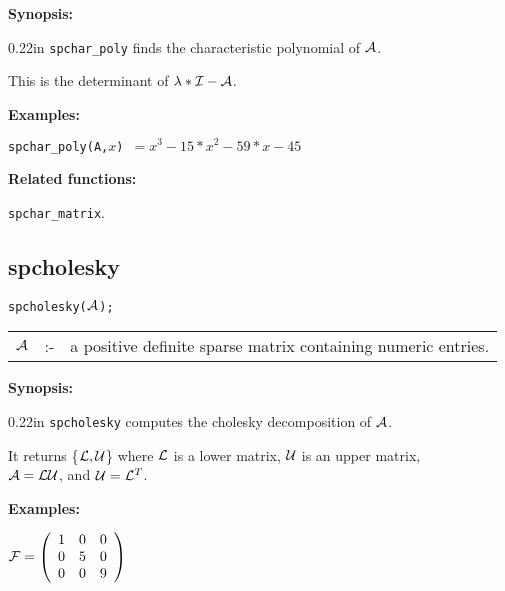 {\bf Synopsis:}

\begin{addtolength}{\leftskip}{0.22in}
{\tt spchar\_poly} finds the characteristic polynomial of
                ${\cal A}$.  

This is the determinant of $\lambda * {\cal I} - {\cal A}$.

\end{addtolength}

{\bf Examples:}

\hspace*{0.175in}
{\tt spchar\_poly({\cal A},$x$) $= x^3-15*x^2-59*x-45$} 

{\bf Related functions:}

\hspace*{0.175in} {\tt spchar\_matrix}. 


\subsection{spcholesky}

\hspace*{0.175in} {\tt spcholesky(${\cal A}$);}

\hspace*{0.1in} 
\begin{tabular}{l l l}
${\cal A}$ &:-& a positive definite sparse matrix containing numeric entries.
\end{tabular}

{\bf Synopsis:} 

\begin{addtolength}{\leftskip}{0.22in}
{\tt spcholesky} computes the cholesky decomposition of ${\cal A}$.

It returns \{${\cal L,U}$\} where ${\cal L}$
is a lower matrix, ${\cal U}$ is an upper matrix, \\ ${\cal A} = 
{\cal LU}$, and ${\cal U} = {\cal L}^T$.

\end{addtolength}

{\bf Examples:}

\begin{flushleft}  
\hspace*{0.175in}
\begin{math}  
{\cal F} = \left( \begin{array}{ccc} 1 & 0 & 0 \\ 0 & 5 & 0 \\ 0 & 0 & 
9
\end{array} \right)
\end{math}  
\end{flushleft}

